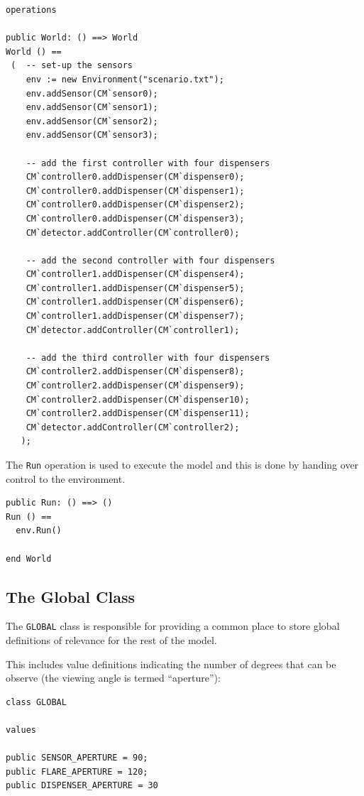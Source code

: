 \documentclass{overturerepchap}
\begin{document}
\begin{lstlisting}
operations

public World: () ==> World
World () ==
 (  -- set-up the sensors
    env := new Environment("scenario.txt");
    env.addSensor(CM`sensor0);
    env.addSensor(CM`sensor1);
    env.addSensor(CM`sensor2);
    env.addSensor(CM`sensor3);

    -- add the first controller with four dispensers
    CM`controller0.addDispenser(CM`dispenser0);
    CM`controller0.addDispenser(CM`dispenser1);
    CM`controller0.addDispenser(CM`dispenser2);
    CM`controller0.addDispenser(CM`dispenser3);
    CM`detector.addController(CM`controller0);

    -- add the second controller with four dispensers
    CM`controller1.addDispenser(CM`dispenser4);
    CM`controller1.addDispenser(CM`dispenser5);
    CM`controller1.addDispenser(CM`dispenser6);
    CM`controller1.addDispenser(CM`dispenser7);
    CM`detector.addController(CM`controller1);
 
    -- add the third controller with four dispensers
    CM`controller2.addDispenser(CM`dispenser8);
    CM`controller2.addDispenser(CM`dispenser9);
    CM`controller2.addDispenser(CM`dispenser10);
    CM`controller2.addDispenser(CM`dispenser11);
    CM`detector.addController(CM`controller2);
   );
\end{lstlisting}

The \texttt{Run} operation is used to execute the model and this is done
by handing over control to the environment. 

\begin{lstlisting}
public Run: () ==> ()
Run () == 
  env.Run()

end World
\end{lstlisting}

\subsection{The Global Class}\label{sec:GlobalSeq}

The \texttt{GLOBAL} class is responsible for providing a common place to
store global definitions of relevance for the rest of the model.

This includes value definitions indicating the number of degrees that can 
be observe (the viewing angle is termed ``aperture''):

\begin{lstlisting}
class GLOBAL

values

public SENSOR_APERTURE = 90;
public FLARE_APERTURE = 120;
public DISPENSER_APERTURE = 30
\end{lstlisting}
\end{document}
